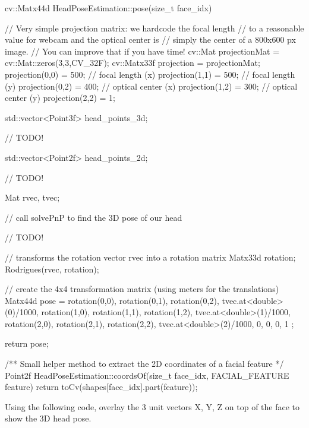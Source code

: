 \documentclass{instructions}
\begin{document}
\begin{cppcode}

cv::Matx44d HeadPoseEstimation::pose(size_t face_idx)
{

    // Very simple projection matrix: we hardcode the focal length
    // to a reasonable value for webcam and the optical center is
    // simply the center of a 800x600 px image.
    // You can improve that if you have time!
    cv::Mat projectionMat = cv::Mat::zeros(3,3,CV_32F);
    cv::Matx33f projection = projectionMat;
    projection(0,0) = 500; // focal length (x)
    projection(1,1) = 500; // focal length (y)
    projection(0,2) = 400; // optical center (x)
    projection(1,2) = 300; // optical center (y)
    projection(2,2) = 1;

    std::vector<Point3f> head_points_3d;

    // TODO!

    std::vector<Point2f> head_points_2d;

    // TODO!

    Mat rvec, tvec;

    // call solvePnP to find the 3D pose of our head

    // TODO!

    // transforms the rotation vector rvec into a rotation matrix
    Matx33d rotation;
    Rodrigues(rvec, rotation);


    // create the 4x4 transformation matrix (using meters for the translations)
    Matx44d pose = {
        rotation(0,0),    rotation(0,1),    rotation(0,2),    tvec.at<double>(0)/1000,
        rotation(1,0),    rotation(1,1),    rotation(1,2),    tvec.at<double>(1)/1000,
        rotation(2,0),    rotation(2,1),    rotation(2,2),    tvec.at<double>(2)/1000,
                    0,                0,                0,                          1
    };

    return pose;
}

/** Small helper method to extract the 2D coordinates of a facial feature
 */
Point2f HeadPoseEstimation::coordsOf(size_t face_idx, FACIAL_FEATURE feature)
{
    return toCv(shapes[face_idx].part(feature));
}

\end{cppcode}


Using the following code, overlay the 3 unit vectors X, Y, Z on top of the face
to show the 3D head pose.
\end{document}
